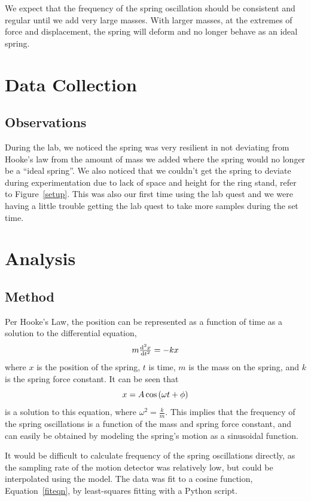 \documentclass{article}
\numberwithin{figure}{section}
\numberwithin{table}{section}
\begin{document}
We expect that the frequency of the spring oscillation should be consistent and regular until we add very large masses.  With larger masses, at the extremes of force and displacement, the spring will deform and no longer behave as an ideal spring. 

\section{Data Collection} 

\subsection{Observations} 

During the lab, we noticed the spring was very resilient in not deviating from Hooke’s law from the amount of mass we added where the spring would no longer be a “ideal spring”. We also noticed that we couldn’t get the spring to deviate during experimentation due to lack of space and height for the ring stand, refer to Figure~\ref{setup}. This was also our first time using the lab quest and we were having a little trouble getting the lab quest to take more samples during the set time.

\section{Analysis} 

\subsection{Method} 

Per Hooke's Law, the position can be represented as a function of time as a solution to the differential equation, 
\begin{equation} 
	m \od[2]{x}{t} = -kx 
\end{equation} 
where $x$ is the position of the spring, $t$ is time, $m$ is the mass on the spring, and $k$ is the spring force constant.  It can be seen that 
\begin{equation}
\protect\label{fiteqn}
x = A \cos \left( \omega t + \phi \right)
\end{equation} 
is a solution to this equation, where $\omega^2 = \frac{k}{m}$.  This implies that the frequency of the spring oscillations is a function of the mass and spring force constant, and can easily be obtained by modeling the spring's motion as a sinusoidal function.

It would be difficult to calculate frequency of the spring oscillations directly, as the sampling rate of the motion detector was relatively low, but could be interpolated using the model.  The data was fit to a cosine function, Equation~\ref{fiteqn}, by least-squares fitting with a Python script.
\end{document}
